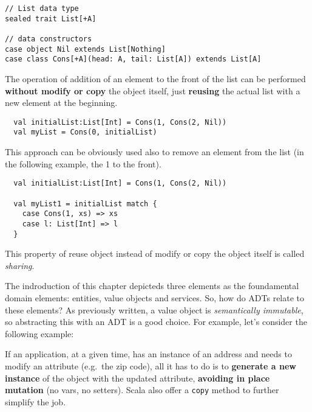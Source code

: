\begin{verbatim}
// List data type
sealed trait List[+A]

// data constructors
case object Nil extends List[Nothing]
case class Cons[+A](head: A, tail: List[A]) extends List[A]
\end{verbatim}

The operation of addition of an element to the front of the list can be
performed \textbf{without modify or copy} the object itself, just
\textbf{reusing} the actual list with a new element at the beginning.

\begin{verbatim}
  val initialList:List[Int] = Cons(1, Cons(2, Nil))
  val myList = Cons(0, initialList)
\end{verbatim}

This approach can be obviously used also to remove an element from the
list (in the following example, the 1 to the front).

\begin{verbatim}
  val initialList:List[Int] = Cons(1, Cons(2, Nil))

  val myList1 = initialList match {
    case Cons(1, xs) => xs
    case l: List[Int] => l
  }
\end{verbatim}

This property of reuse object instead of modify or copy the object
itself is called \emph{sharing}.

The indroduction of this chapter depicteds three elements as the
foundamental domain elements: entities, value objects and services. So,
how do ADTs relate to these elements? As previously written, a value
object is \emph{semantically immutable}, so abstracting this with an ADT
is a good choice. For example, let's consider the following example:

\begin{Shaded}
\begin{Highlighting}[]
  
\end{Highlighting}
\end{Shaded}

If an application, at a given time, has an instance of an address and
needs to modify an attribute (e.g.~the zip code), all it has to do is to
\textbf{generate a new instance} of the object with the updated
attribute, \textbf{avoiding in place mutation} (no vars, no setters).
Scala also offer a \texttt{copy} method to further simplify the job.

